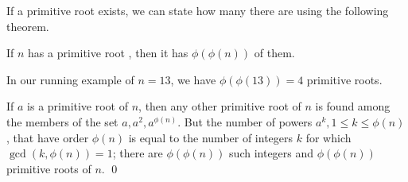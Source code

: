 If a primitive root exists, we can state how many there are using the following theorem.

\begin{theorem}
  If $n$ has a primitive root , then it has $\phi(\phi(n))$ of them.
\end{theorem}

In our running example of $n=13$, we have $\phi(\phi(13)) = 4$ primitive roots.

If $a$ is a primitive root of $n$, then any other primitive root of $n$ is found among the members of the set $a, a^2, a^{\phi(n)}$. But the number of powers $a^k, 1 \leq k \leq \phi(n)$, that have order $\phi(n)$ is equal to the number of integers $k$ for which $\gcd(k, \phi(n)) = 1$; there are $\phi(\phi(n))$ such integers and $\phi(\phi(n))$ primitive roots of $n$. \qed




